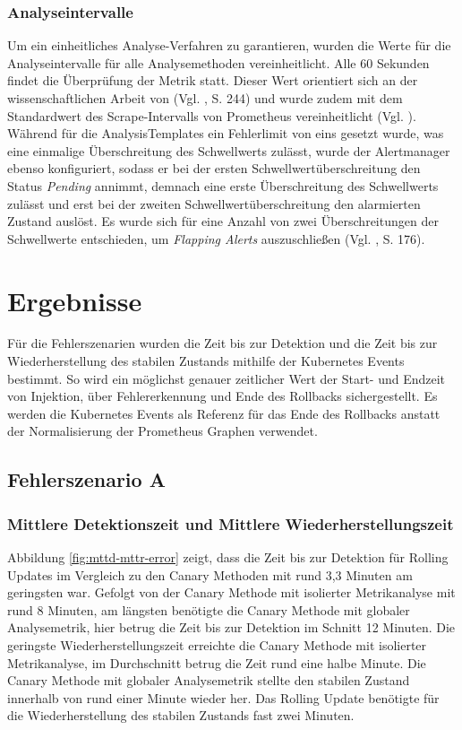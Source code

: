 \documentclass[
12pt,
a4paper,
twoside,
openright
]{report}
\begin{document}
	\subsection{Analyseintervalle}
	Um ein einheitliches Analyse-Verfahren zu garantieren, wurden die Werte für die Analyseintervalle für alle Analysemethoden vereinheitlicht. Alle 60 Sekunden findet die Überprüfung der Metrik statt. Dieser Wert orientiert sich an der wissenschaftlichen Arbeit von (Vgl. \parencite{islam2024predictive}, S. 244) und wurde zudem mit dem Standardwert des Scrape-Intervalls von Prometheus vereinheitlicht (Vgl. \parencite{PromDef}). Während für die AnalysisTemplates ein Fehlerlimit von eins gesetzt wurde, was eine einmalige Überschreitung des Schwellwerts zulässt, wurde der Alertmanager ebenso konfiguriert, sodass er bei der ersten Schwellwertüberschreitung den Status \textit{Pending} annimmt, demnach eine erste Überschreitung des Schwellwerts zulässt und erst bei der zweiten Schwellwertüberschreitung den alarmierten Zustand auslöst. Es wurde sich für eine Anzahl von zwei Überschreitungen der Schwellwerte entschieden, um \textit{Flapping Alerts} auszuschließen (Vgl. \parencite{vinnakota2025creating}, S. 176).
	
	\chapter{Ergebnisse}
	Für die Fehlerszenarien wurden die Zeit bis zur Detektion und die Zeit bis zur Wiederherstellung des stabilen Zustands mithilfe der Kubernetes Events bestimmt. So wird ein möglichst genauer zeitlicher Wert der Start- und Endzeit von Injektion, über Fehlererkennung und Ende des Rollbacks sichergestellt. Es werden die Kubernetes Events als Referenz für das Ende des Rollbacks anstatt der Normalisierung der Prometheus Graphen verwendet.
	
	\section{Fehlerszenario A}
	\subsection{Mittlere Detektionszeit und Mittlere Wiederherstellungszeit}
	Abbildung \ref{fig:mttd-mttr-error} zeigt, dass die Zeit bis zur Detektion für Rolling Updates im Vergleich zu den Canary Methoden mit rund 3,3 Minuten am geringsten war. Gefolgt von der Canary Methode mit isolierter Metrikanalyse mit rund 8 Minuten, am längsten benötigte die Canary Methode mit globaler Analysemetrik, hier betrug die Zeit bis zur Detektion im Schnitt 12 Minuten. Die geringste Wiederherstellungszeit erreichte die Canary Methode mit isolierter Metrikanalyse, im Durchschnitt betrug die Zeit rund eine halbe Minute. 
	Die Canary Methode mit globaler Analysemetrik stellte den stabilen Zustand innerhalb von rund einer Minute wieder her. Das Rolling Update benötigte für die Wiederherstellung des stabilen Zustands fast zwei Minuten. 
	
\end{document}
